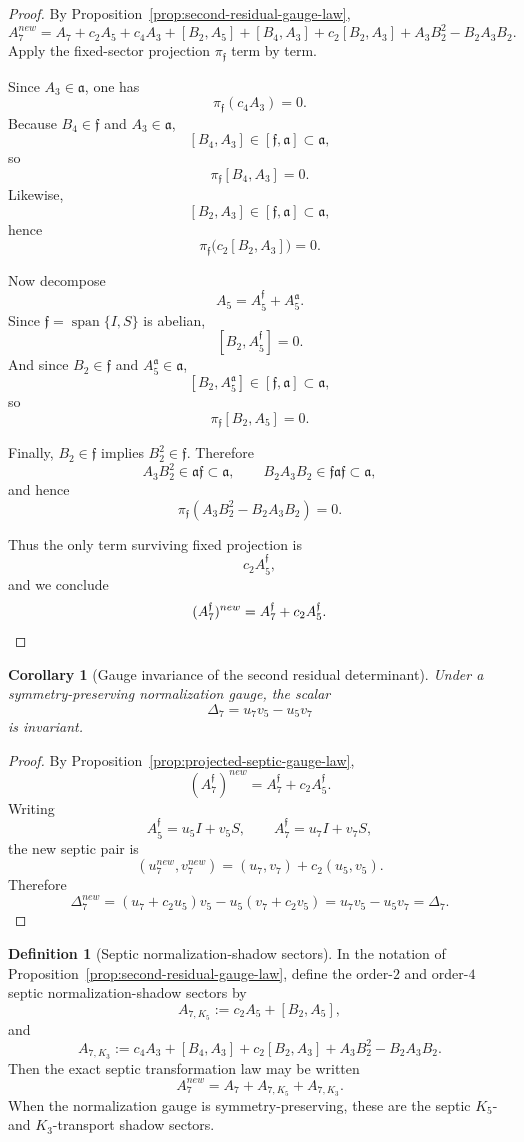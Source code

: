 \documentclass[11pt,a4paper]{amsart}
\def\new{new}%
\theoremstyle{plain}
\newtheorem{corollary}[theorem]{Corollary}
\theoremstyle{definition}
\newtheorem{definition}[theorem]{Definition}
\newcommand{\new}{\mathrm{new}}
\begin{document}
\begin{proof}
By Proposition~\ref{prop:second-residual-gauge-law},
\[
A_7^{\new}
=
A_7+c_2A_5+c_4A_3+[B_2,A_5]+[B_4,A_3]
+c_2[B_2,A_3]+A_3B_2^2-B_2A_3B_2.
\]
Apply the fixed-sector projection $\pi_{\mathfrak f}$ term by term.

Since $A_3\in\mathfrak a$, one has
\[
\pi_{\mathfrak f}(c_4A_3)=0.
\]
Because $B_4\in\mathfrak f$ and $A_3\in\mathfrak a$,
\[
[B_4,A_3]\in[\mathfrak f,\mathfrak a]\subset\mathfrak a,
\]
so
\[
\pi_{\mathfrak f}[B_4,A_3]=0.
\]
Likewise,
\[
[B_2,A_3]\in[\mathfrak f,\mathfrak a]\subset\mathfrak a,
\]
hence
\[
\pi_{\mathfrak f}\bigl(c_2[B_2,A_3]\bigr)=0.
\]

Now decompose
\[
A_5=A_5^{\mathfrak f}+A_5^{\mathfrak a}.
\]
Since $\mathfrak f=\operatorname{span}\{I,S\}$ is abelian,
\[
[B_2,A_5^{\mathfrak f}]=0.
\]
And since $B_2\in\mathfrak f$ and $A_5^{\mathfrak a}\in\mathfrak a$,
\[
[B_2,A_5^{\mathfrak a}]\in[\mathfrak f,\mathfrak a]\subset\mathfrak a,
\]
so
\[
\pi_{\mathfrak f}[B_2,A_5]=0.
\]

Finally, $B_2\in\mathfrak f$ implies $B_2^2\in\mathfrak f$. Therefore
\[
A_3B_2^2\in\mathfrak a\mathfrak f\subset\mathfrak a,
\qquad
B_2A_3B_2\in\mathfrak f\mathfrak a\mathfrak f\subset\mathfrak a,
\]
and hence
\[
\pi_{\mathfrak f}(A_3B_2^2-B_2A_3B_2)=0.
\]

Thus the only term surviving fixed projection is
\[
c_2A_5^{\mathfrak f},
\]
and we conclude
\[
(A_7^{\mathfrak f})^{\new}=A_7^{\mathfrak f}+c_2A_5^{\mathfrak f}.
\qedhere
\]
\end{proof}

\begin{corollary}[Gauge invariance of the second residual determinant]
\label{cor:delta7-gauge-invariant}
Under a symmetry-preserving normalization gauge, the scalar
\[
\Delta_7=u_7v_5-u_5v_7
\]
is invariant.
\end{corollary}

\begin{proof}
By Proposition~\ref{prop:projected-septic-gauge-law},
\[
(A_7^{\mathfrak f})^{\new}=A_7^{\mathfrak f}+c_2A_5^{\mathfrak f}.
\]
Writing
\[
A_5^{\mathfrak f}=u_5I+v_5S,
\qquad
A_7^{\mathfrak f}=u_7I+v_7S,
\]
the new septic pair is
\[
(u_7^{\new},v_7^{\new})=(u_7,v_7)+c_2(u_5,v_5).
\]
Therefore
\[
\Delta_7^{\new}
=
(u_7+c_2u_5)v_5-u_5(v_7+c_2v_5)
=
u_7v_5-u_5v_7
=
\Delta_7.
\]
\end{proof}

\begin{definition}[Septic normalization-shadow sectors]
\label{def:septic-shadow-sectors}
In the notation of Proposition~\ref{prop:second-residual-gauge-law}, define
the order-$2$ and order-$4$ septic normalization-shadow sectors by
\[
A_{7,K_5}:=c_2A_5+[B_2,A_5],
\]
and
\[
A_{7,K_3}:=
c_4A_3+[B_4,A_3]+c_2[B_2,A_3]+A_3B_2^2-B_2A_3B_2.
\]
Then the exact septic transformation law may be written
\[
A_7^{\new}=A_7+A_{7,K_5}+A_{7,K_3}.
\]
When the normalization gauge is symmetry-preserving, these are the septic
$K_5$- and $K_3$-transport shadow sectors.
\end{definition}
\end{document}
